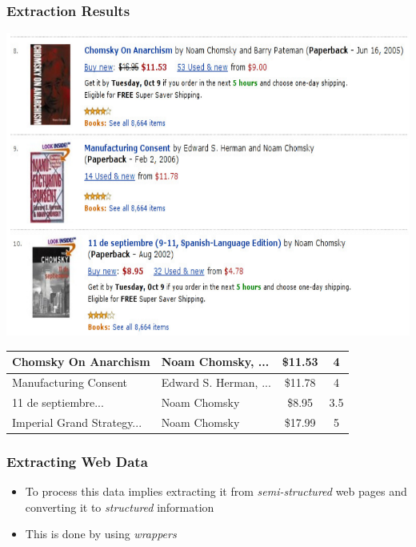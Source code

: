 \documentclass[svgnames]{beamer}
\begin{document}

\begin{frame} \frametitle{Extraction Results}
  
  \centering
  \includegraphics[width=.7\linewidth]{example3}\\
  \vfill
  \footnotesize
  \begin{tabular}{|l|l|c|c|}\hline
    Chomsky On Anarchism & Noam Chomsky, ... & \$11.53 & 4 \\\hline
    Manufacturing Consent & Edward S. Herman, ... & \$11.78 & 4 \\\hline
    11 de septiembre... & Noam Chomsky & \$8.95 & 3.5 \\\hline
    Imperial Grand Strategy... & Noam Chomsky & \$17.99 & 5 \\\hline
  \end{tabular}

\end{frame}


\begin{frame}
    \frametitle{Extracting Web Data}

    \begin{itemize}
    \item To process this data implies extracting it from
        \emph{semi-structured} web pages and converting it to \emph{structured}
        information
    \item This is done by using \emph{wrappers}
    \end{itemize}

\end{frame}
\end{document}
